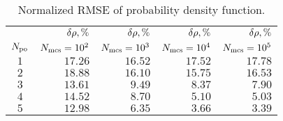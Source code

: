 \begin{table}
  \centering
  \caption{Normalized RMSE of probability density function.}
  \vspace{-10pt}
  \begin{tabular}{crrrr}
    \toprule
    {} & $\delta\rho, \%$ & $\delta\rho, \%$ & $\delta\rho, \%$ & $\delta\rho, \%$ \\
    ${N_\text{po}}$ & $N_\text{mcs} = 10^2$ & $N_\text{mcs} = 10^3$ & $N_\text{mcs} = 10^4$ & $N_\text{mcs} = 10^5$ \\
    \midrule
    $1$ & $17.26$ & $16.52$ & $17.52$ & $17.78$ \\
    $2$ & $18.88$ & $16.10$ & $15.75$ & $16.53$ \\
    $3$ & $13.61$ & $ 9.49$ & $ 8.37$ & $ 7.90$ \\
    $4$ & $14.52$ & $ 8.70$ & $ 5.10$ & $ 5.03$ \\
    $5$ & $12.98$ & $ 6.35$ & $ 3.66$ & $ 3.39$ \\
    \bottomrule
  \end{tabular}
  \vspace{-10pt}
\end{table}
